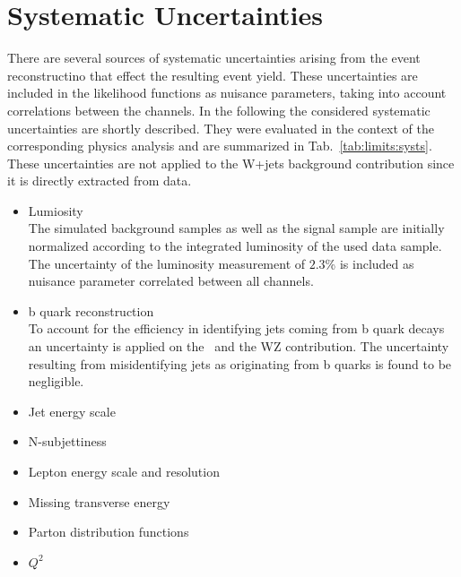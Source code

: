 \section{Systematic Uncertainties}
\label{sec:systematics}
There are several sources of systematic uncertainties arising from the event reconstructino that effect the resulting event yield. These uncertainties are included in the likelihood functions as nuisance parameters, taking into account correlations between the channels. In the following the considered systematic uncertainties are shortly described. They were evaluated in the context of the corresponding physics analysis \cite{PAS} and are summarized in Tab.~\ref{tab:limits:systs}. These uncertainties are not applied to the W+jets background contribution since it is directly extracted from data.
\begin{itemize}
\item Lumiosity\\
The simulated background samples as well as the signal sample are initially normalized according to the integrated luminosity of the used data sample. The uncertainty of the luminosity measurement of $2.3$\% is included as nuisance parameter correlated between all channels.
\item b quark reconstruction\\
To account for the efficiency in identifying jets coming from b quark decays \cite{bquarkuncert} an uncertainty is applied on the \ttbar \ and the WZ contribution. The uncertainty resulting from misidentifying jets as originating from b quarks is found to be negligible.
\item Jet energy scale\\

\item N-subjettiness\\
\item Lepton energy scale and resolution\\
\item Missing transverse energy\\
\item Parton distribution functions\\
\item $Q^2$\\
\end{itemize}
